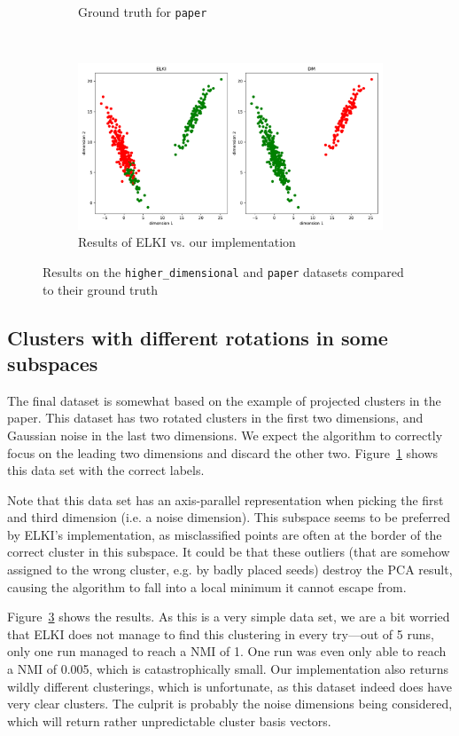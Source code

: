 \documentclass[english]{scrartcl}
\begin{document}
\begin{figure}[p]
\begin{subfigure}{0.6\textwidth}
        \caption{Ground truth for \texttt{paper}}
        \label{fig:true_paper}
    \end{subfigure}%
    \\
    \begin{subfigure}{0.6\textwidth}
        \includegraphics[width=\textwidth]{img/paper_cmp}
        \caption{Results of ELKI vs. our implementation}
        \label{fig:paper_results}
    \end{subfigure}
    \caption{Results on the \texttt{higher\_dimensional} and \texttt{paper} datasets compared to their ground truth}
\end{figure}

\subsection{Clusters with different rotations in some subspaces}

The final dataset is somewhat based on the example of projected clusters
in the paper. This dataset has two rotated clusters in the first two dimensions,
and Gaussian noise in the last two dimensions. We expect the algorithm to
correctly focus on the leading two dimensions and discard the other two.
Figure~\ref{fig:true_paper} shows this data set with the correct labels.

Note that this data set has an axis-parallel representation when picking the
first and third dimension (i.e. a noise dimension). This subspace seems to be
preferred by ELKI's implementation, as misclassified points are often at the
border of the correct cluster in this subspace. It could be that these outliers
(that are somehow assigned to the wrong cluster, e.g. by badly placed seeds)
destroy the PCA result, causing the algorithm to fall into a local minimum it
cannot escape from.

Figure~\ref{fig:paper_results} shows the results. As this is a very simple
data set, we are a bit worried that ELKI does not manage to find this
clustering in every try---out of 5 runs, only one run managed to reach a
NMI of 1. One run was even only able to reach a NMI of 0.005, which is
catastrophically small. Our implementation also returns wildly different
clusterings, which is unfortunate, as this dataset indeed does have
very clear clusters. The culprit is probably the noise dimensions
being considered, which will return rather unpredictable cluster basis
vectors.
\end{document}
